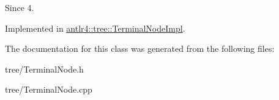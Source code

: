 \begin{DoxySince}{Since}
4. 
\end{DoxySince}


Implemented in \hyperlink{classantlr4_1_1tree_1_1TerminalNodeImpl_a4043200d8cd1c741ca2f63ac173d30a0}{antlr4\+::tree\+::\+Terminal\+Node\+Impl}.



The documentation for this class was generated from the following files\+:\begin{DoxyCompactItemize}
\item 
tree/Terminal\+Node.\+h\item 
tree/Terminal\+Node.\+cpp\end{DoxyCompactItemize}
